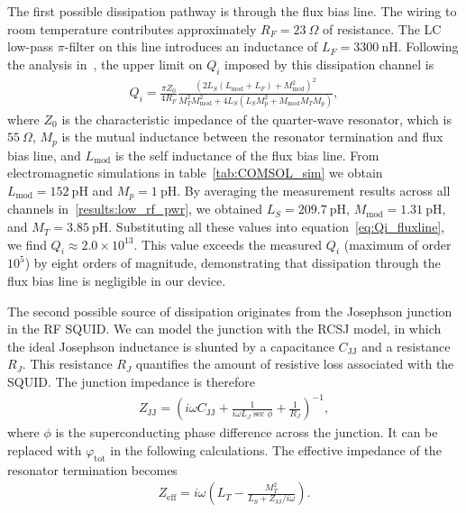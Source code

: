 \documentclass[
 prd,
 reprint,
 superscriptaddress,
 amsmath,amssymb,
 aps,
 floatfix,
]{revtex4-2}
\begin{document}
The first possible dissipation pathway is through the flux bias line. The wiring to room temperature contributes approximately $R_F = 23~\Omega$ of resistance. The LC low-pass $\pi$-filter on this line introduces an inductance of $L_F = 3300~\mathrm{nH}$. Following the analysis in~\cite{mates_microwave_2011}, the upper limit on $Q_i$ imposed by this dissipation channel is
\begin{gather}
Q_i =
\frac{\pi Z_0}{4 R_F}
\frac{\left(2L_S(L_{\mathrm{mod}} + L_F) + M_{\mathrm{mod}}^2\right)^2}
{M_T^2 M_{\mathrm{mod}}^2 + 4L_S\left(L_S M_p^2 + M_{\mathrm{mod}} M_T M_p\right)},
\label{eq:Qi_fluxline}
\end{gather}
where $Z_0$ is the characteristic impedance of the quarter-wave resonator, which is $55~\Omega$, $M_p$ is the mutual inductance between the resonator termination and flux bias line, and $L_{\text{mod}}$ is the self inductance of the flux bias line. From electromagnetic simulations in table~\ref{tab:COMSOL_sim} we obtain $L_{\mathrm{mod}} = 152~\mathrm{pH}$ and $M_p = 1~\mathrm{pH}$. By averaging the measurement results across all channels in~\cref{results:low_rf_pwr}, we obtained $L_S = 209.7~\mathrm{pH}$, $M_{\mathrm{mod}} = 1.31~\mathrm{pH}$, and $M_T = 3.85~\mathrm{pH}$. Substituting all these values into equation~\eqref{eq:Qi_fluxline}, we find $Q_i \approx 2.0 \times 10^{13}$. This value exceeds the measured $Q_i$ (maximum of order $10^5$) by eight orders of magnitude, demonstrating that dissipation through the flux bias line is negligible in our device.

The second possible source of dissipation originates from the Josephson junction in the RF SQUID. We can model the junction with the RCSJ model, in which the ideal Josephson inductance is shunted by a capacitance $C_{\mathrm{JJ}}$ and a resistance $R_J$. This resistance $R_J$ quantifies the amount of resistive loss associated with the SQUID. The junction impedance is therefore
\begin{gather}
Z_{\mathrm{JJ}} =
\left(
i \omega C_{\mathrm{JJ}}
+ \frac{1}{i \omega L_J \sec \phi}
+ \frac{1}{R_J}
\right)^{-1},
\label{eq:ZJJ}
\end{gather}
where $\phi$ is the superconducting phase difference across the junction. It can be replaced with $\varphi_{\mathrm{tot}}$ in the following calculations. The effective impedance of the resonator termination becomes
\begin{gather}
Z_{\mathrm{eff}} = i \omega
\left(
L_T - \frac{M_T^2}{L_S + Z_{\mathrm{JJ}}/i\omega}
\right).
\label{eq:Z_eff}
\end{gather}
\end{document}
